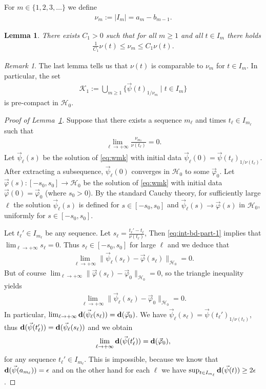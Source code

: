 \documentclass[10pt,reqno]{amsart}
\newcommand{\HH}{\mathcal{H}}
\newcommand{\fy}{\varphi}
\newcommand{\EQ}[1]{\begin{equation}\begin{split} #1 \end{split}\end{equation}}
\numberwithin{equation}{section}
\newtheorem{lem}[thm]{Lemma}
\theoremstyle{remark}
\newtheorem{rem}[thm]{Remark}
\newcommand{\0}{\emptyset}
\newcommand{\eps}{\epsilon}
\newcommand{\bfd}{{\bf d}}
\newcommand{\calK}{\mathcal K}
\begin{document}
For $m \in \{1, 2, 3, \ldots\}$ we define
\EQ{
\nu_m := |I_m| = a_m - b_{m-1}.
}
\begin{lem}\label{l:interval-bd}
There exists $C_1 > 0$ such that for all $m \geq 1$ and all $t \in I_m$ there holds
\EQ{
\frac{1}{C_1} \nu(t) \leq \nu_m \leq C_1 \nu(t).
}
\end{lem}
\begin{rem}
The last lemma tells us that $\nu(t)$ is comparable to $\nu_m$ for $t \in I_m$.
In particular, the set
\EQ{
\calK_1:=  \bigcup_{m \geq 1}\{  \vec \psi(t)_{1/\nu_m} \mid t \in I_m \} \label{eq:K1-comp}
}
is pre-compact in $\HH_0$. 
\end{rem}
\begin{proof}[Proof of Lemma~\ref{l:interval-bd}]
Suppose that there exists a sequence $m_\ell$ and times $t_\ell \in I_{m_\ell}$ such that
\EQ{ \label{eq:int-bd-part-1}
\lim_{\ell\to+\infty}\frac{\nu_{m_\ell}}{\nu(t_\ell)} = 0.
}
Let $\vec\psi_\ell(s)$ be the solution of \eqref{eq:wmk} with initial data
$
\vec\psi_\ell(0) = \vec\psi(t_\ell)_{1/\nu(t_\ell)}.
$
After extracting a subsequence, $\vec\psi_\ell(0)$ converges in $\HH_0$ to some $\vec\fy_0$.
Let $\vec\fy(s):[{-}s_0, s_0] \to \HH_0$ be the solution of \eqref{eq:wmk} with initial data
$\vec\fy(0) = \vec\fy_0$ (where $s_0 > 0$). By the standard Cauchy theory, for sufficiently large $\ell$
the solution $\vec\psi_\ell(s)$ is defined for $s \in [{-}s_0, s_0]$ and $\vec\psi_\ell(s) \to \vec\fy(s)$
in $\HH_0$, uniformly for $s \in [{-}s_0, s_0]$.

Let $t_\ell' \in I_{m_\ell}$ be any sequence. Let $s_\ell = \frac{t_\ell' - t_\ell}{\nu(t_\ell)}$,
Then \eqref{eq:int-bd-part-1} implies that $\lim_{\ell \to +\infty} s_\ell = 0$.
Thus $s_\ell \in [{-}s_0, s_0]$ for large $\ell$ and we deduce that
\EQ{
\lim_{\ell\to+\infty}\|\vec\psi_\ell(s_\ell) - \vec\fy(s_\ell)\|_{\HH_0} = 0.
}
But of course $\lim_{\ell\to+\infty}\|\vec\fy(s_\ell) - \vec\fy_0\|_{\HH_0} = 0$,
so the triangle inequality yields
\EQ{
\lim_{\ell\to+\infty}\|\vec\psi_\ell(s_\ell) - \vec\fy_0\|_{\HH_0} = 0.
}
In particular, $\lim_{\ell\to+\infty} \bfd(\vec\psi_\ell(s_\ell)) = \bfd(\vec\fy_0)$.
We have $\vec\psi_\ell(s_\ell) = \vec\psi(t_\ell')_{1/\nu(t_\ell)}$, thus $\bfd(\vec\psi(t_\ell')) = \bfd(\vec\psi_\ell(s_\ell))$
and we obtain
\EQ{
\lim_{\ell\to+\infty} \bfd(\vec\psi(t_\ell')) = \bfd(\vec\fy_0),
}
for any sequence $t_\ell' \in I_{m_\ell}$. This is impossible, because we know that $\bfd(\vec\psi(a_{m_\ell})) = \eps$
and on the other hand for each $\ell$ we have $\sup_{t\in I_{m_\ell}} \bfd(\vec\psi(t)) \geq 2\eps$.


\end{proof}
\end{document}
